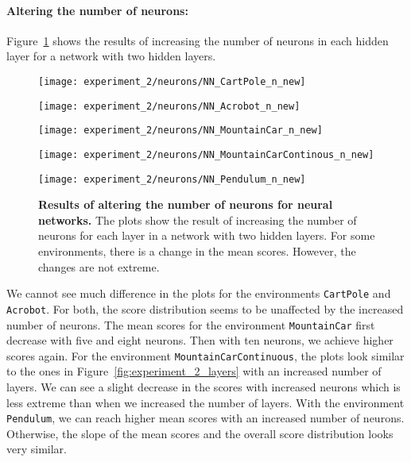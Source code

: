 \paragraph{Altering the number of neurons:} Figure~\ref{fig:experiment_2_neurons} shows the results of increasing the number of neurons in each hidden layer for a network with two hidden layers.
\begin{figure}[!ht]
  \centering
  \texttt{[image: experiment\_2/neurons/NN\_CartPole\_n\_new]}

    \vspace{0.2cm}

  \texttt{[image: experiment\_2/neurons/NN\_Acrobot\_n\_new]}

    \vspace{0.2cm}

  \texttt{[image: experiment\_2/neurons/NN\_MountainCar\_n\_new]}

    \vspace{0.2cm}

  \texttt{[image: experiment\_2/neurons/NN\_MountainCarContinous\_n\_new]}

    \vspace{0.2cm}

  \texttt{[image: experiment\_2/neurons/NN\_Pendulum\_n\_new]}
\caption[Results of altering the number of neurons for neural networks]{
  \textbf{Results of altering the number of neurons for neural networks.}
  The plots show the result of increasing the number of neurons for each layer in a network with two hidden layers. For some environments, there is a change in the mean scores. However, the changes are not extreme.
}
\label{fig:experiment_2_neurons}
\end{figure}
We cannot see much difference in the plots for the environments \verb|CartPole| and \verb|Acrobot|. For both, the score distribution seems to be unaffected by the increased number of neurons. The mean scores for the environment \verb|MountainCar| first decrease with five and eight neurons. Then with ten neurons, we achieve higher scores again. For the environment \verb|MountainCarContinuous|, the plots look similar to the ones in Figure~\ref{fig:experiment_2_layers} with an increased number of layers. We can see a slight decrease in the scores with increased neurons which is less extreme than when we increased the number of layers. With the environment \verb|Pendulum|, we can reach higher mean scores with an increased number of neurons. Otherwise, the slope of the mean scores and the overall score distribution looks very similar.

